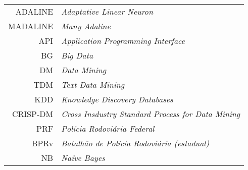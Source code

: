 \vspace*{12pt}

\noindent

\vspace{1em}

\begin{tabular}{r  l}
 ADALINE & \textit{Adaptative Linear Neuron}\\
 MADALINE & \textit{Many Adaline}\\
 API & \textit{Application Programming Interface}\\
 BG & \textit{Big Data}\\
 DM & \textit{Data Mining}\\
 TDM & \textit{Text Data Mining}\\
 KDD & \textit{Knowledge Discovery Databases}\\
 CRISP-DM & \textit{Cross Insdustry Standard Process for Data Mining}\\
 PRF & \textit{Polícia Rodoviária Federal}\\
 BPRv & \textit{Batalhão de Polícia Rodoviária (estadual)}\\
 NB & \textit{Naïve Bayes}\\

 
\end{tabular}


